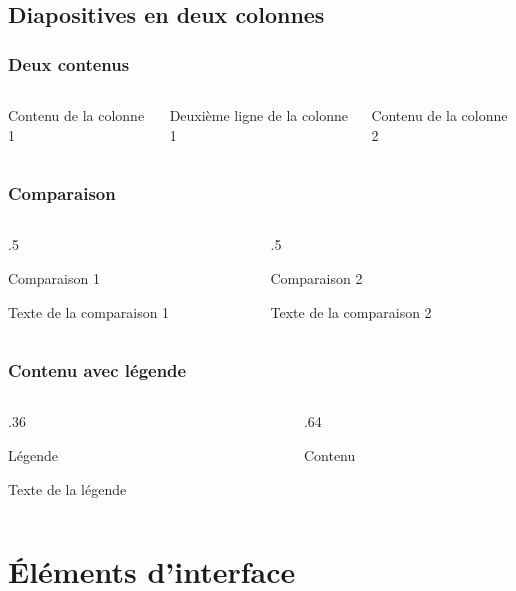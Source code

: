 \documentclass[aspectratio=1610,compress,t,english,french]{beamer}
\newenvironment{HECcomparaison}[1]{%
	\begin{column}[t]{.5\textwidth}
		\vspace{-7mm}		
		\begin{block}{#1}
}{%
		\end{block}
	\end{column}
}
\newenvironment{HEClegende}[1]{%
	\begin{column}[t]{.36\textwidth}
		\vspace{-7mm}
		\begin{block}{#1}
}{%
		\end{block}
	\end{column}
}
\newenvironment{HECcontenuLegende}{%
	\begin{column}[t]{.64\textwidth}
		\vspace{-7mm}
}{%
	\end{column}
}
\begin{document}
\subsection{Diapositives en deux colonnes}

\begin{frame}
	\frametitle{Deux contenus}
	\begin{columns}
			Contenu de la colonne 1
			
			Deuxième ligne de la colonne 1
			
			Contenu de la colonne 2
	\end{columns}
\end{frame}

\begin{frame}
\frametitle{Comparaison}
\begin{columns}
	\begin{HECcomparaison}{Comparaison 1}
		Texte de la comparaison 1
	\end{HECcomparaison}

	\begin{HECcomparaison}{Comparaison 2}
		Texte de la comparaison 2
	\end{HECcomparaison}
\end{columns}
\end{frame}

\begin{frame}
\frametitle{Contenu avec légende}
\begin{columns}
	\begin{HEClegende}{Légende}
		Texte de la légende
	\end{HEClegende}
	\begin{HECcontenuLegende}
		Contenu
	\end{HECcontenuLegende}
\end{columns}
\end{frame}

\section{Éléments d'interface}
\hypertarget{elementsInterface}{}
\end{document}
